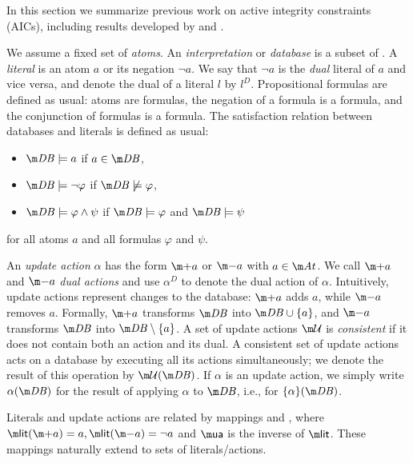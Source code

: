 In this section we summarize previous work on active integrity constraints (AICs), including results developed by \citet{ppdp/FlescaGZ04,iclp/CaropreseGSZ06,tplp/CaropreseT11} and \citet{tase/Cruz-FilipeGEN13}.

We assume a fixed set \atoms of \emph{atoms}. An \emph{interpretation} or \emph{database} is a subset of \atoms. A \emph{literal} is an atom $a$ or its negation $\lnot a$. 
We say that $\lnot a$ is the \emph{dual} literal of $a$ and vice versa, and denote the dual of a literal $l$ by $l^D$. 
Propositional formulas are defined as usual: atoms are formulas, the negation of a formula is a formula, and the conjunction of formulas is a formula. 
The satisfaction relation between databases \db and literals is defined as usual: 
\begin{itemize}
 \item $\db \models a$ if $a\in\db$,
 \item $\db \models \lnot \varphi$ if $\db\not\models \varphi$,
 \item $\db \models \varphi\land\psi$ if $\db\models \varphi$ and $\db \models \psi$
\end{itemize}
for all atoms $a$ and all formulas $\varphi$ and $\psi$.

An \emph{update action} $\alpha$ has the form $\add a$ or $\remove a$ with $a\in \atoms$. We call $\add a$ and $\remove a$ \emph{dual actions} and use $\alpha^D$ to denote the dual action of $\alpha$. 
Intuitively, update actions represent changes to the database: $\add a$ adds $a$, while $\remove a$ removes $a$. Formally, $\add a$ transforms $\db$ into $\db\cup\{a\}$, and $\remove a $ transforms $\db$ into $\db\setminus\{a\}$.
A set of update actions $\UU$ is \emph{consistent} if it does not contain both an action and its dual. A consistent set of update actions \UU acts on a database \db by executing all its actions simultaneously; we denote the result of this operation by $\UU(\db)$. If $\alpha$ is an update action, we simply write $\alpha(\db)$ for the result of applying $\alpha$ to $\db$, i.e.,  for $\{\alpha\}(\db)$.  

Literals and update actions are related by mappings \litof and \actof, where $\litof(\add a)= a, \litof(\remove a) = \lnot a$ and $\actof$ is the inverse of $\litof$.
These mappings naturally extend to sets of literals/actions. 

